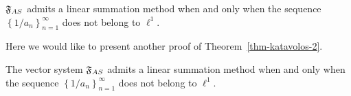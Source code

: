 \documentclass[12pt]{amsart}
\begin{document}
      \begin{theorem}
        \label{thm-katavolos-2}
          $\mathfrak{F}_{AS}$ admits a linear summation method when and only when
            the sequence $\left\{1/a_n\right\}_{n=1}^\infty$ does not belong to $\ell^1$.
      \end{theorem}
      Here we would like to present another proof of Theorem~\ref{thm-katavolos-2}.
      \begin{prop}
        The vector system $\mathfrak{F}_{AS}$ admits a linear summation method when and only when
          the sequence $\left\{1/a_n\right\}_{n=1}^\infty$ does not belong to $\ell^1$.
      \end{prop}
\end{document}
